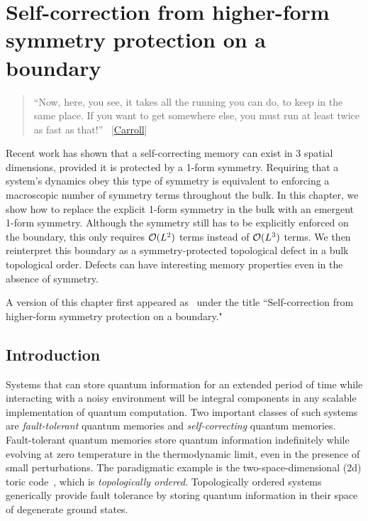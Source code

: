 
\chapter{Self-correction from higher-form symmetry protection on a boundary } \label{chp:boundary}

\begin{quotation}
	 “Now, here, you see, it takes all the running you can do, to keep in the same place. If you want to get somewhere else, you must run at least twice as fast as that!” ~[\hyperlink{cite.\therefsection @Carroll2002Alice}{Carroll}]
\end{quotation}

Recent work has shown that a self-correcting memory can exist in 3 spatial dimensions, provided it is protected by a 1-form symmetry. Requiring that a system's dynamics obey this type of symmetry is equivalent to enforcing a macroscopic number of symmetry terms throughout the bulk. In this chapter, we show how to replace the explicit 1-form symmetry in the bulk with an emergent 1-form symmetry. Although the symmetry still has to be explicitly enforced on the boundary, this only requires $\cal{O}(L^2)$ terms instead of $\cal{O}(L^3)$ terms. We then reinterpret this boundary as a symmetry-protected topological defect in a bulk topological order. Defects can have interesting memory properties even in the absence of symmetry.

A version of this chapter first appeared as~\cite{Stahl2023Boundary} under the title ``Self-correction from higher-form symmetry protection on a boundary."

\section{Introduction} \label{sec:bdyintro}

Systems that can store quantum information for an extended period of time while interacting with a noisy environment will be integral components in any scalable implementation of quantum computation. Two important classes of such systems are \emph{fault-tolerant} quantum memories and \emph{self-correcting} quantum memories. Fault-tolerant quantum memories store quantum information indefinitely while evolving at zero temperature in the thermodynamic limit, even in the presence of small perturbations. The paradigmatic example is the two-space-dimensional (2d) toric code~\cite{Kitaev2003Fault}, which is \emph{topologically ordered}. Topologically ordered systems~\cite{Wen1990Topological} generically provide fault tolerance by storing quantum information in their space of degenerate ground states. 


